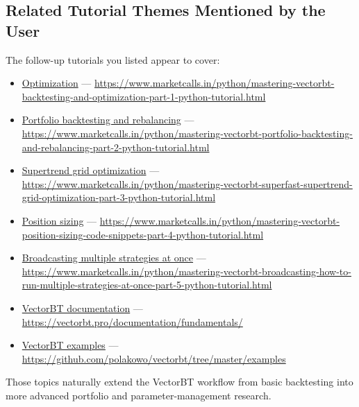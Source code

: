 \documentclass[12pt,openany]{book}
\begin{document}
\subsection{Related Tutorial Themes Mentioned by the User}

The follow-up tutorials you listed appear to cover:

\begin{itemize}[leftmargin=*]
    \item \href{https://www.marketcalls.in/python/mastering-vectorbt-backtesting-and-optimization-part-1-python-tutorial.html}{Optimization} --- \url{https://www.marketcalls.in/python/mastering-vectorbt-backtesting-and-optimization-part-1-python-tutorial.html}
    \item \href{https://www.marketcalls.in/python/mastering-vectorbt-portfolio-backtesting-and-rebalancing-part-2-python-tutorial.html}{Portfolio backtesting and rebalancing} --- \url{https://www.marketcalls.in/python/mastering-vectorbt-portfolio-backtesting-and-rebalancing-part-2-python-tutorial.html}
    \item \href{https://www.marketcalls.in/python/mastering-vectorbt-superfast-supertrend-grid-optimization-part-3-python-tutorial.html}{Supertrend grid optimization} --- \url{https://www.marketcalls.in/python/mastering-vectorbt-superfast-supertrend-grid-optimization-part-3-python-tutorial.html}
    \item \href{https://www.marketcalls.in/python/mastering-vectorbt-position-sizing-code-snippets-part-4-python-tutorial.html}{Position sizing} --- \url{https://www.marketcalls.in/python/mastering-vectorbt-position-sizing-code-snippets-part-4-python-tutorial.html}
    \item \href{https://www.marketcalls.in/python/mastering-vectorbt-broadcasting-how-to-run-multiple-strategies-at-once-part-5-python-tutorial.html}{Broadcasting multiple strategies at once} --- \url{https://www.marketcalls.in/python/mastering-vectorbt-broadcasting-how-to-run-multiple-strategies-at-once-part-5-python-tutorial.html}
    \item \href{https://vectorbt.pro/documentation/fundamentals/}{VectorBT documentation} --- \url{https://vectorbt.pro/documentation/fundamentals/}
    \item \href{https://github.com/polakowo/vectorbt/tree/master/examples}{VectorBT examples} --- \url{https://github.com/polakowo/vectorbt/tree/master/examples}
\end{itemize}

Those topics naturally extend the VectorBT workflow from basic backtesting into more advanced portfolio and parameter-management research.
\end{document}
